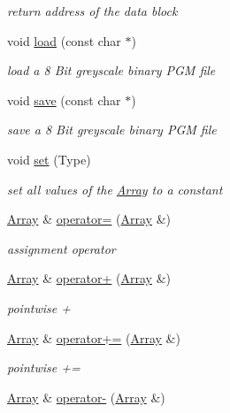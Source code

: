 \begin{DoxyCompactItemize}
\begin{DoxyCompactList}\small\item\em return address of the data block \end{DoxyCompactList}\item 
void \hyperlink{classArray_a1179285b483948cc3066f2f1981d2f3c}{load} (const char $\ast$)
\begin{DoxyCompactList}\small\item\em load a 8 Bit greyscale binary P\+GM file \end{DoxyCompactList}\item 
void \hyperlink{classArray_af6f8d0bcd627b53e7d2d783a0193c881}{save} (const char $\ast$)
\begin{DoxyCompactList}\small\item\em save a 8 Bit greyscale binary P\+GM file \end{DoxyCompactList}\item 
void \hyperlink{classArray_a033557644e78114216ac412e0ffde2d1}{set} (Type)
\begin{DoxyCompactList}\small\item\em set all values of the \hyperlink{classArray}{Array} to a constant \end{DoxyCompactList}\item 
\hyperlink{classArray}{Array} \& \hyperlink{classArray_a3a2db5a07afd46ed5fe5df6d1e503013}{operator=} (\hyperlink{classArray}{Array} \&)
\begin{DoxyCompactList}\small\item\em assignment operator \end{DoxyCompactList}\item 
\hyperlink{classArray}{Array} \& \hyperlink{classArray_a4663604d9585d88761c34d0740ffb339}{operator+} (\hyperlink{classArray}{Array} \&)
\begin{DoxyCompactList}\small\item\em pointwise + \end{DoxyCompactList}\item 
\hyperlink{classArray}{Array} \& \hyperlink{classArray_a1da46a893e5ffbdd6d65e5c07b6497ba}{operator+=} (\hyperlink{classArray}{Array} \&)
\begin{DoxyCompactList}\small\item\em pointwise += \end{DoxyCompactList}\item 
\hyperlink{classArray}{Array} \& \hyperlink{classArray_a2dba5effaa07efb01b47cd62883a6337}{operator-\/} (\hyperlink{classArray}{Array} \&)

\end{DoxyCompactItemize}
